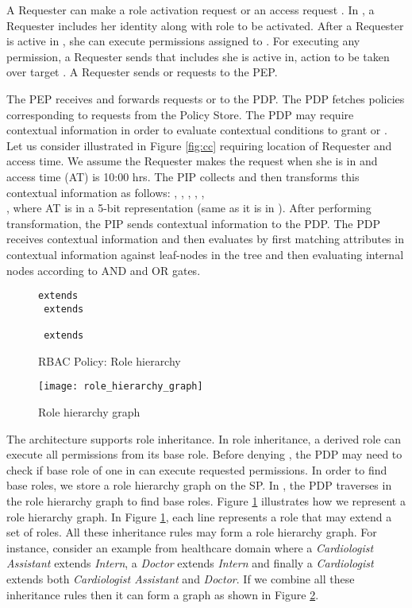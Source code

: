 \documentclass[final,5p,times,twocolumn]{elsarticle}
\newcommand{\Keywords}{\lstset{keywords={if,then,can,be,active,in,execute}}}
\begin{document}
A Requester can make a role activation request  or an access request . In , a Requester includes her identity  along with role  to be activated. After a Requester is active in , she can execute permissions assigned to . For executing any permission, a Requester sends  that includes  she is active in, action  to be taken over target . A Requester sends  or  requests to the PEP. 

The PEP receives and forwards requests  or  to the PDP. The PDP fetches policies corresponding to requests from the Policy Store. The PDP may require contextual information in order to evaluate contextual conditions to grant  or . Let us consider  illustrated in Figure \ref{fig:cc} requiring location of Requester and access time. We assume the Requester makes the request when she is in  and access time (AT) is 10:00 hrs. The PIP collects and then transforms this contextual information as follows: , , , , , \\ , where AT is in a 5-bit representation (same as it is in ). After performing transformation, the PIP sends contextual information to the PDP. The PDP receives contextual information and then evaluates  by first matching attributes in contextual information against leaf-nodes in the  tree and then evaluating internal nodes according to AND and OR gates.

\begin{figure}
\Keywords
\begin{lstlisting}[style=AMMA,numbers=none,breaklines,mathescape,rulesepcolor=\color{black}]
 extends 
 extends 

 extends 

\end{lstlisting}
\caption{RBAC Policy: Role hierarchy}
\label{fig:policy-role-hierarchy}
\end{figure}

\begin{figure}
\centering
\texttt{[image: role\_hierarchy\_graph]} \caption{Role hierarchy graph}
\label{fig:role_hierarchy_graph}
\end{figure}

The  architecture supports role inheritance. In role inheritance, a derived role can execute all permissions from its base role. Before denying , the PDP may need to check if base role of one in  can execute requested permissions. In order to find base roles, we store a role hierarchy graph on the SP. In , the PDP traverses in the role hierarchy graph to find base roles. Figure \ref{fig:policy-role-hierarchy} illustrates how we represent a role hierarchy graph. In Figure \ref{fig:policy-role-hierarchy}, each line represents a role that may extend a set of roles. All these inheritance rules may form a role hierarchy graph. For instance, consider an example from healthcare domain where a \emph{Cardiologist Assistant} extends \emph{Intern}, a \emph{Doctor} extends \emph{Intern} and finally a \emph{Cardiologist} extends both \emph{Cardiologist Assistant} and \emph{Doctor}. If we combine all these inheritance rules then it can form a graph as shown in Figure \ref{fig:role_hierarchy_graph}.
\end{document}
